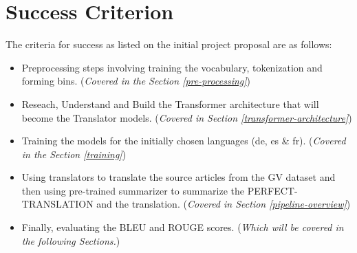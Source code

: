 \documentclass[12pt,a4paper,twoside,openright]{report}
\begin{document}
\section{Success Criterion}
The criteria for success as listed on the initial project proposal are as follows:
\begin{itemize}
    \item Preprocessing steps involving training the vocabulary, tokenization and forming bins. (\textit{Covered in the Section \ref{pre-processing}})
    \item Reseach, Understand and Build the Transformer architecture that will become the Translator models. (\textit{Covered in Section \ref{transformer-architecture}})
    \item Training the models for the initially chosen languages (de, es \& fr). (\textit{Covered in the Section \ref{training}})
    \item Using translators to translate the source articles from the GV dataset and then using pre-trained summarizer to summarize the PERFECT-TRANSLATION and the translation. (\textit{Covered in Section \ref{pipeline-overview}})
    \item Finally, evaluating the BLEU and ROUGE scores. (\textit{Which will be covered in the following Sections.})
\end{itemize}
\end{document}
